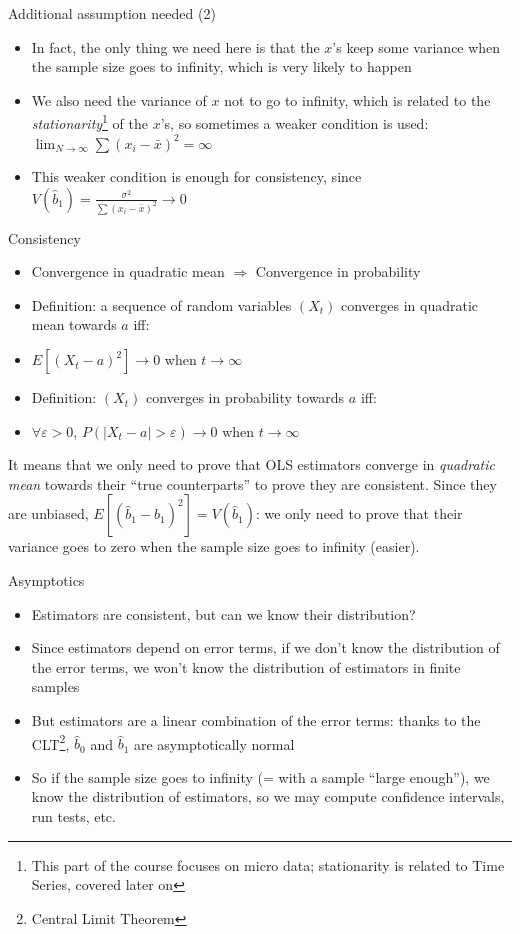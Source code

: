 \documentclass[aspectratio=169]{beamer}
\begin{document}
\begin{frame}{Additional assumption needed (2)}
\begin{itemize}
    \item In fact, the only thing we need here is that the $x$'s keep some variance when the sample size goes to infinity, which is very likely to happen
    \item We also need the variance of $x$ not to go to infinity, which is related to the \textit{stationarity}\footnote{This part of the course focuses on micro data; stationarity is related to Time Series, covered later on} of the $x$'s, so sometimes a weaker condition is used: $\lim_{N\to\infty} \sum(x_i - \bar{x})^2 = \infty$
    \item This weaker condition is enough for consistency, since $V(\hat{b}_1) = \frac{\sigma^2}{\sum(x_i - \bar{x})^2} \to 0$
\end{itemize}
\end{frame}

\begin{frame}{Consistency}
\begin{itemize}
    \item Convergence in quadratic mean $\Rightarrow$ Convergence in probability
    \item Definition: a sequence of random variables $(X_t)$ converges in quadratic mean towards $a$ iff:
    \item $E[(X_t - a)^2] \to 0$ when $t \to \infty$
    \item Definition: $(X_t)$ converges in probability towards $a$ iff:
    \item $\forall \varepsilon > 0$, $P(|X_t - a| > \varepsilon) \to 0$ when $t \to \infty$
\end{itemize}

It means that we only need to prove that OLS estimators converge in \textit{quadratic mean} towards their ``true counterparts'' to prove they are consistent. Since they are unbiased, $E[(\hat{b}_1 - b_1)^2] = V(\hat{b}_1)$: we only need to prove that their variance goes to zero when the sample size goes to infinity (easier).
\end{frame}

\begin{frame}{Asymptotics}
\begin{itemize}
    \item Estimators are consistent, but can we know their distribution?
    \item Since estimators depend on error terms, if we don't know the distribution of the error terms, we won't know the distribution of estimators in finite samples
    \item But estimators are a linear combination of the error terms: thanks to the CLT\footnote{Central Limit Theorem}, $\hat{b}_0$ and $\hat{b}_1$ are asymptotically normal
    \item So if the sample size goes to infinity (= with a sample ``large enough''), we know the distribution of estimators, so we may compute confidence intervals, run tests, etc.
\end{itemize}
\end{frame}
\end{document}
